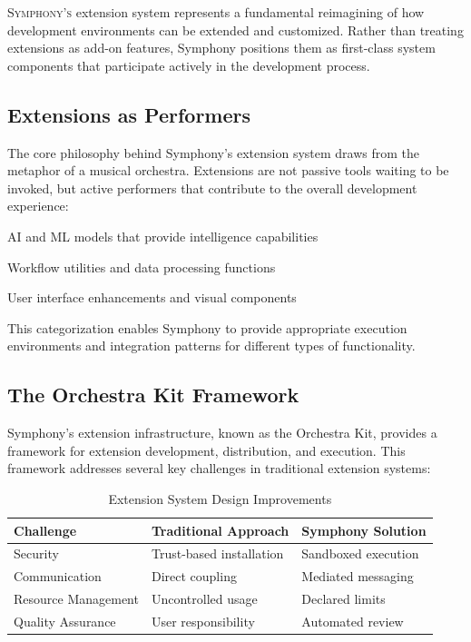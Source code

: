 
\lettrine{S}{ymphony's} extension system represents a fundamental reimagining of how development environments can be extended and customized. Rather than treating extensions as add-on features, Symphony positions them as \textcolor{brandPrimary}{first-class system components} that participate actively in the development process.

\subsection*{Extensions as Performers}

The core philosophy behind Symphony's extension system draws from the metaphor of a musical orchestra. Extensions are not passive tools waiting to be invoked, but active \textcolor{brandSecondary}{performers} that contribute to the overall development experience:

\begin{description}[leftmargin=3cm,labelwidth=2.5cm]
    \item[\textbf{Instruments}] AI and ML models that provide intelligence capabilities
    \item[\textbf{Operators}] Workflow utilities and data processing functions
    \item[\textbf{Motifs}] User interface enhancements and visual components
\end{description}

This categorization enables Symphony to provide appropriate execution environments and integration patterns for different types of functionality.

\subsection*{The Orchestra Kit Framework}

Symphony's extension infrastructure, known as the \textcolor{brandAccent}{Orchestra Kit}, provides a framework for extension development, distribution, and execution. This framework addresses several key challenges in traditional extension systems:

\begin{table}[ht]
\centering
\begin{tabular}{@{}lll@{}}
\toprule
\textbf{Challenge} & \textbf{Traditional Approach} & \textbf{Symphony Solution} \\
\midrule
Security & Trust-based installation & Sandboxed execution \\
Communication & Direct coupling & Mediated messaging \\
Resource Management & Uncontrolled usage & Declared limits \\
Quality Assurance & User responsibility & Automated review \\
\bottomrule
\end{tabular}
\caption{Extension System Design Improvements}
\end{table}

